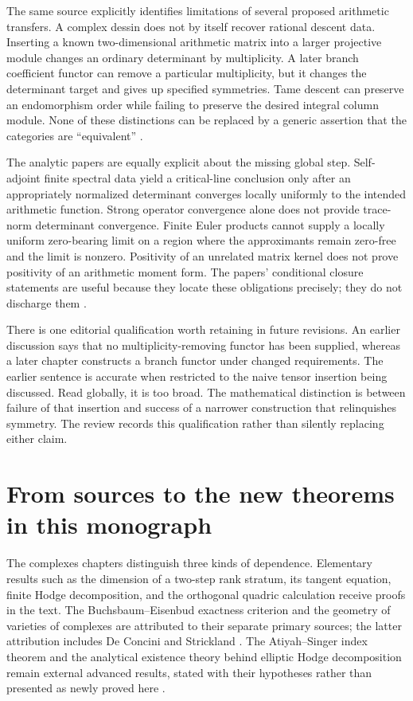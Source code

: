 The same source explicitly identifies limitations of several proposed
arithmetic transfers. A complex dessin does not by itself recover rational
descent data. Inserting a known two-dimensional arithmetic matrix into a
larger projective module changes an ordinary determinant by multiplicity.
A later branch coefficient functor can remove a particular multiplicity,
but it changes the determinant target and gives up specified symmetries.
Tame descent can preserve an endomorphism order while failing to preserve
the desired integral column module. None of these distinctions can be
replaced by a generic assertion that the categories are ``equivalent''
\cite{GRHRepo}.

The analytic papers are equally explicit about the missing global step.
Self-adjoint finite spectral data yield a critical-line conclusion only
after an appropriately normalized determinant converges locally uniformly
to the intended arithmetic function. Strong operator convergence alone
does not provide trace-norm determinant convergence. Finite Euler products
cannot supply a locally uniform zero-bearing limit on a region where the
approximants remain zero-free and the limit is nonzero. Positivity of an
unrelated matrix kernel does not prove positivity of an arithmetic moment
form. The papers' conditional closure statements are useful because they
locate these obligations precisely; they do not discharge them
\cite{GRHRepo}.

There is one editorial qualification worth retaining in future revisions.
An earlier discussion says that no multiplicity-removing functor has been
supplied, whereas a later chapter constructs a branch functor under changed
requirements. The earlier sentence is accurate when restricted to the naive
tensor insertion being discussed. Read globally, it is too broad. The
mathematical distinction is between failure of that insertion and success
of a narrower construction that relinquishes symmetry. The review records
this qualification rather than silently replacing either claim.

\section{From sources to the new theorems in this monograph}

The complexes chapters distinguish three kinds of dependence. Elementary
results such as the dimension of a two-step rank stratum, its tangent
equation, finite Hodge decomposition, and the orthogonal quadric calculation
receive proofs in the text. The Buchsbaum--Eisenbud exactness criterion and
the geometry of varieties of complexes are attributed to their separate
primary sources; the latter attribution includes De Concini and Strickland
\cite{v2BE1973,v2DS1981,v2DEP1982}. The Atiyah--Singer index theorem and
the analytical existence theory behind elliptic Hodge decomposition remain
external advanced results, stated with their hypotheses rather than
presented as newly proved here \cite{v2AS1968I,v2AS1968III}.

